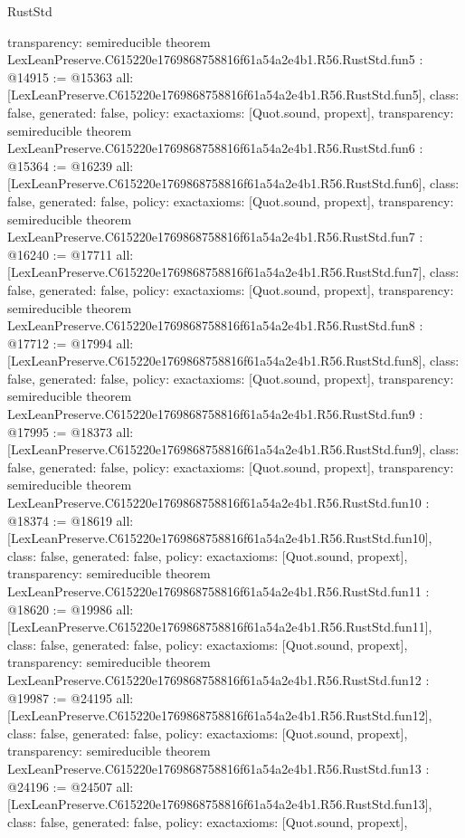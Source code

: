 \begin{lexlean}{RustStd}
\begin{coremodule}
{  transparency: semireducible
}
theorem LexLeanPreserve.C615220e1769868758816f61a54a2e4b1.R56.RustStd.fun5 : @14915 := @15363 {
  all: [LexLeanPreserve.C615220e1769868758816f61a54a2e4b1.R56.RustStd.fun5],
  class: false,
  generated: false,
  policy: exact{axioms: [Quot.sound, propext]},
  transparency: semireducible
}
theorem LexLeanPreserve.C615220e1769868758816f61a54a2e4b1.R56.RustStd.fun6 : @15364 := @16239 {
  all: [LexLeanPreserve.C615220e1769868758816f61a54a2e4b1.R56.RustStd.fun6],
  class: false,
  generated: false,
  policy: exact{axioms: [Quot.sound, propext]},
  transparency: semireducible
}
theorem LexLeanPreserve.C615220e1769868758816f61a54a2e4b1.R56.RustStd.fun7 : @16240 := @17711 {
  all: [LexLeanPreserve.C615220e1769868758816f61a54a2e4b1.R56.RustStd.fun7],
  class: false,
  generated: false,
  policy: exact{axioms: [Quot.sound, propext]},
  transparency: semireducible
}
theorem LexLeanPreserve.C615220e1769868758816f61a54a2e4b1.R56.RustStd.fun8 : @17712 := @17994 {
  all: [LexLeanPreserve.C615220e1769868758816f61a54a2e4b1.R56.RustStd.fun8],
  class: false,
  generated: false,
  policy: exact{axioms: [Quot.sound, propext]},
  transparency: semireducible
}
theorem LexLeanPreserve.C615220e1769868758816f61a54a2e4b1.R56.RustStd.fun9 : @17995 := @18373 {
  all: [LexLeanPreserve.C615220e1769868758816f61a54a2e4b1.R56.RustStd.fun9],
  class: false,
  generated: false,
  policy: exact{axioms: [Quot.sound, propext]},
  transparency: semireducible
}
theorem LexLeanPreserve.C615220e1769868758816f61a54a2e4b1.R56.RustStd.fun10 : @18374 := @18619 {
  all: [LexLeanPreserve.C615220e1769868758816f61a54a2e4b1.R56.RustStd.fun10],
  class: false,
  generated: false,
  policy: exact{axioms: [Quot.sound, propext]},
  transparency: semireducible
}
theorem LexLeanPreserve.C615220e1769868758816f61a54a2e4b1.R56.RustStd.fun11 : @18620 := @19986 {
  all: [LexLeanPreserve.C615220e1769868758816f61a54a2e4b1.R56.RustStd.fun11],
  class: false,
  generated: false,
  policy: exact{axioms: [Quot.sound, propext]},
  transparency: semireducible
}
theorem LexLeanPreserve.C615220e1769868758816f61a54a2e4b1.R56.RustStd.fun12 : @19987 := @24195 {
  all: [LexLeanPreserve.C615220e1769868758816f61a54a2e4b1.R56.RustStd.fun12],
  class: false,
  generated: false,
  policy: exact{axioms: [Quot.sound, propext]},
  transparency: semireducible
}
theorem LexLeanPreserve.C615220e1769868758816f61a54a2e4b1.R56.RustStd.fun13 : @24196 := @24507 {
  all: [LexLeanPreserve.C615220e1769868758816f61a54a2e4b1.R56.RustStd.fun13],
  class: false,
  generated: false,
  policy: exact{axioms: [Quot.sound, propext]},
}
\end{coremodule}
\end{lexlean}
